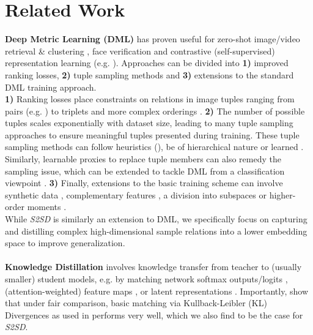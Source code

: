 \documentclass{article} \usepackage{arxiv_style,times}
\begin{document}
\section{Related Work}
\textbf{Deep Metric Learning (DML)} has proven useful for zero-shot image/video retrieval \& clustering \citep{semihard,margin,Brattoli_2020_CVPR}, face verification \citep{sphereface,arcface} and contrastive (self-supervised) representation learning (e.g. \cite{moco,chen2020simple,pretextmisra}).
Approaches can be divided into \textbf{1)} improved ranking losses, \textbf{2)} tuple sampling methods and \textbf{3)} extensions to the standard DML training approach.\\
\textbf{1)} Ranking losses place constraints on relations in image tuples ranging from pairs (e.g. \cite{contrastive}) to triplets \citep{semihard} and more complex orderings \citep{quadtruplet,lifted,npairs,multisimilarity}.
\textbf{2)} The number of possible tuples scales exponentially with dataset size, leading to many tuple sampling approaches to ensure meaningful tuples presented during training. These tuple sampling methods can follow heuristics (\cite{semihard,margin}), be of hierarchical nature \citep{htl} or learned \citep{roth2020pads}. 
Similarly, learnable proxies to replace tuple members \citep{proxynca,kim2020proxy,softriple} can also remedy the sampling issue, which can be extended to tackle DML from a classification viewpoint \citep{zhai2018classification,arcface}.
\textbf{3)} Finally, extensions to the basic training scheme can involve synthetic data \citep{dvml,hardness-aware,daml}, complementary features \citep{mic,milbich2020diva}, a division into subspaces \citep{Sanakoyeu_2019_CVPR,dreml,abe,abier} or higher-order moments \citep{horde}.\\ 
While \textit{S2SD} is similarly an extension to DML, we specifically focus on capturing and distilling complex high-dimensional sample relations into a lower embedding space to improve generalization.\\
\\
\textbf{Knowledge Distillation} involves knowledge transfer from teacher to (usually smaller) student models, e.g. by matching network softmax outputs/logits \citep{bucilu2006model,hinton2015distilling}, (attention-weighted) feature maps \citep{romero2014fitnets,zagoruyko2016paying}, or latent representations \citep{Ahn_2019,Park_2019,tian2019contrastive,laskar2020dataefficient}.
Importantly, \cite{tian2019contrastive} show that under fair comparison, basic matching via Kullback-Leibler (KL) Divergences as used in \cite{hinton2015distilling} performs very well, which we also find to be the case for \textit{S2SD}. 
\end{document}
